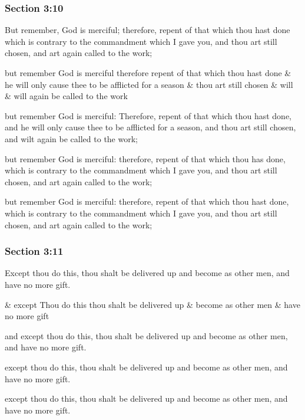 	\subsubsection{Section 3:10} %
		\label{DC3-10}

		But remember, God is merciful; therefore, repent of that which thou hast done which is contrary to the commandment which I gave you, and thou art still chosen, and art again called to the work;

		\begin{framed}
		\scriptsize
			\begin{compactdesc}
				\item[JSP] but remember God is merciful therefore repent of that which thou hast done \& he will only cause thee to be afflicted for a season \& thou art still chosen \& will \& will again be called to the work
				\item[BC] but remember God is merciful: Therefore, repent of that which thou hast done, and he will only cause thee to be afflicted for a season, and thou art still chosen, and wilt again be called to the work;
				\item[DC 1835] but remember God is merciful: therefore, repent of that which thou has done, which is contrary to the commandment which I gave you, and thou art still chosen, and art again called to the work;
				\item[DC 1844] but remember God is merciful: therefore, repent of that which thou hast done, which is contrary to the commandment which I gave you, and thou art still chosen, and art again called to the work;
			\end{compactdesc}
		\end{framed}

	\subsubsection{Section 3:11} %
		\label{DC3-11}

		Except thou do this, thou shalt be delivered up and become as other men, and have no more gift.

		\begin{framed}
		\scriptsize
			\begin{compactdesc}
				\item[JSP] \& except Thou do this thou shalt be delivered up \& become as other men \& have no more gift
				\item[BC] and except thou do this, thou shalt be delivered up and become as other men, and have no more gift.
				\item[DC 1835] except thou do this, thou shalt be delivered up and become as other men, and have no more gift.
				\item[DC 1844] except thou do this, thou shalt be delivered up and become as other men, and have no more gift.
			\end{compactdesc}
		\end{framed}

